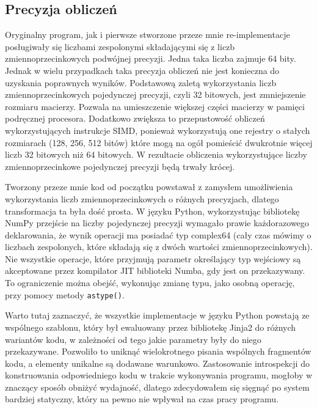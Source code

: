 \documentclass[11pt, a4paper]{article}
\newcommand{\code}[1]{\texttt{#1}}
\begin{document}
\begin{sloppypar}
    \subsection{Precyzja obliczeń}
    Oryginalny program, jak i pierwsze stworzone przeze mnie re-implementacje posługiwały
    się liczbami zespolonymi składającymi się z liczb zmiennoprzecinkowych podwójnej precyzji.
    Jedna taka liczba zajmuje 64 bity. Jednak w wielu przypadkach taka precyzja obliczeń
    nie jest konieczna do uzyskania poprawnych wyników. Podstawową zaletą wykorzystania
    liczb zmiennoprzecinkowych pojedynczej precyzji, czyli 32 bitowych, jest
    zmniejszenie rozmiaru macierzy. Pozwala na umieszczenie większej części macierzy w pamięci
    podręcznej procesora. Dodatkowo zwiększa to przepustowość obliczeń wykorzystujących
    instrukcje SIMD, ponieważ wykorzystują one rejestry o stałych rozmiarach (128, 256,
    512 bitów) które mogą na ogół pomieścić dwukrotnie więcej liczb 32 bitowych niż 64 bitowych.
    W rezultacie obliczenia wykorzystujące liczby zmiennoprzecinkowe pojedynczej
    precyzji będą trwały krócej.

    Tworzony przeze mnie kod od początku powstawał z zamysłem umożliwienia wykorzystania
    liczb zmiennoprzecinkowych o różnych precyzjach, dlatego transformacja ta była dość prosta.
    W języku Python, wykorzystując bibliotekę NumPy przejście na liczby pojedynczej precyzji
    wymagało prawie każdorazowego deklarowania, że wynik operacji ma posiadać typ
    complex64 (cały czas mówimy o liczbach zespolonych, które składają się z dwóch
    wartości zmiennoprzecinkowych). Nie wszystkie operacje, które przyjmują parametr określający
    typ wejściowy są akceptowane przez kompilator JIT biblioteki Numba, gdy jest on
    przekazywany. To ograniczenie można obejść, wykonując zmianę typu, jako osobną operację,
    przy pomocy metody \code{astype()}.

    Warto tutaj zaznaczyć, że wszystkie implementacje w języku Python powstają ze
    wspólnego szablonu, który był ewaluowany przez bibliotekę Jinja2 do różnych wariantów
    kodu, w zależności od tego jakie parametry były do niego przekazywane. Pozwoliło to uniknąć
    wielokrotnego pisania wspólnych fragmentów kodu, a elementy unikalne są dodawane
    warunkowo. Zastosowanie introspekcji do konstruowania odpowiedniego kodu w trakcie wykonywania
    programu, mogłoby w znaczący sposób obniżyć wydajność, dlatego zdecydowałem się sięgnąć
    po system bardziej statyczny, który na pewno nie wpływał na czas pracy programu.


\end{sloppypar}
\end{document}
